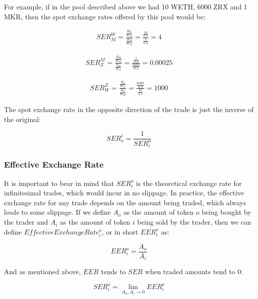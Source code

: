 \documentclass[11pt]{amsart}
\begin{document}
For example, if in the pool described above we had 10 WETH, 6000 ZRX and 1 MKR, then the spot exchange rates offered by this pool would be:

\begin{align*}
SER^{W}_{M} = \frac{\frac{B_{W}}{W_{W}}}{\frac{B_{M}}{W_{M}}} = \frac{\frac{10}{0.5}}{\frac{1}{0.2}} = 4  \end{align*}

\begin{align*}
SER^{M}_{Z} = \frac{\frac{B_{M}}{W_{M}}}{\frac{B_{Z}}{W_{Z}}} = \frac{\frac{1}{0.2}}{\frac{6000}{0.3}} = 0.00025
\end{align*}

\begin{align*}
SER^{Z}_{W} = \frac{\frac{B_{Z}}{W_{Z}}}{\frac{B_{W}}{W_{W}}} = \frac{\frac{6000}{0.3}}{\frac{10}{0.5}} = 1000 \end{align*}

The spot exchange rate in the opposite direction of the trade is just the inverse of the original:

\begin{equation}
SER^{i}_{o} = \frac{1}{SER^{o}_{i}}
\end{equation}

\subsubsection{Effective Exchange Rate}

It is important to bear in mind that $SER^{o}_{i}$ is the theoretical exchange rate for infinitesimal trades, which would incur in no slippage. In practice, the effective exchange rate for any trade depends on the amount being traded, which always leads to some slippage. If we define $A_{o}$ as the amount of token $o$ being bought by the trader and $A_{i}$ as the amount of token $i$ being sold by the trader, then we can define $EffectiveExchangeRate^{o}_{i}$, or in short $EER^{o}_{i}$ as:

\begin{equation}
EER^{o}_{i} = \frac{A_{o}}{A_{i}} \end{equation}

And as mentioned above, $EER$ tends to $SER$ when traded amounts tend to 0:

\begin{equation}
\label{equation:EER_tends_to_SER}
SER^{o}_{i} = \lim_{A_{o},A_{i}\to 0} EER^{o}_{i}
\end{equation}
\end{document}
